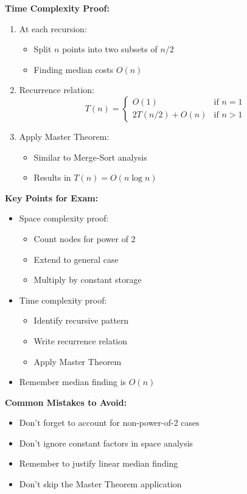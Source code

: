 \textbf{Time Complexity Proof:}
\begin{enumerate}[leftmargin=*,noitemsep]
    \item At each recursion:
        \begin{itemize}[noitemsep,topsep=0pt]
            \item Split $n$ points into two subsets of $n/2$
            \item Finding median costs $O(n)$
        \end{itemize}
    \item Recurrence relation:
        \[ T(n) = \begin{cases}
            O(1) & \text{if } n = 1 \\
            2T(n/2) + O(n) & \text{if } n > 1
        \end{cases} \]
    \item Apply Master Theorem:
        \begin{itemize}[noitemsep,topsep=0pt]
            \item Similar to Merge-Sort analysis
            \item Results in $T(n) = O(n\log n)$
        \end{itemize}
\end{enumerate}

\textbf{Key Points for Exam:}
\begin{itemize}[noitemsep,leftmargin=*]
    \item Space complexity proof:
        \begin{itemize}[noitemsep,topsep=0pt]
            \item Count nodes for power of 2
            \item Extend to general case
            \item Multiply by constant storage
        \end{itemize}
    \item Time complexity proof:
        \begin{itemize}[noitemsep,topsep=0pt]
            \item Identify recursive pattern
            \item Write recurrence relation
            \item Apply Master Theorem
        \end{itemize}
    \item Remember median finding is $O(n)$
\end{itemize}

\textbf{Common Mistakes to Avoid:}
\begin{itemize}[noitemsep,leftmargin=*]
    \item Don't forget to account for non-power-of-2 cases
    \item Don't ignore constant factors in space analysis
    \item Remember to justify linear median finding
    \item Don't skip the Master Theorem application
\end{itemize}

